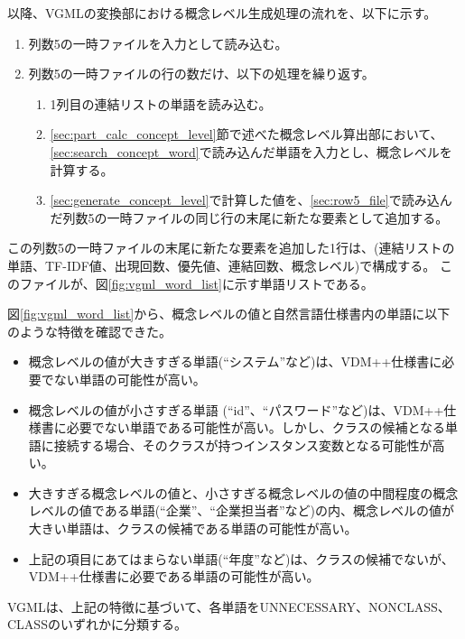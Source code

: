 以降、VGMLの変換部における概念レベル生成処理の流れを、以下に示す。

\begin{enumerate}
    \item 列数5の一時ファイルを入力として読み込む。
    \label{sec:row5_file}
    \item 列数5の一時ファイルの行の数だけ、以下の処理を繰り返す。
        \begin{enumerate}
            \item 1列目の連結リストの単語を読み込む。
            \label{sec:search_concept_word}
            \item \ref{sec:part_calc_concept_level}節で述べた概念レベル算出部において、\ref{sec:search_concept_word}で読み込んだ単語を入力とし、概念レベルを計算する。
            \label{sec:generate_concept_level}
            \item \ref{sec:generate_concept_level}で計算した値を、\ref{sec:row5_file}で読み込んだ列数5の一時ファイルの同じ行の末尾に新たな要素として追加する。
        \end{enumerate}
\end{enumerate}

この列数5の一時ファイルの末尾に新たな要素を追加した1行は、(連結リストの単語、TF-IDF値、出現回数、優先値、連結回数、概念レベル)で構成する。
このファイルが、図\ref{fig:vgml_word_list}に示す単語リストである。

図\ref{fig:vgml_word_list}から、概念レベルの値と自然言語仕様書内の単語に以下のような特徴を確認できた。

\begin{itemize}
    \item 概念レベルの値が大きすぎる単語(``システム''など)は、VDM++仕様書に必要でない単語の可能性が高い。
    \item 概念レベルの値が小さすぎる単語 (``id''、``パスワード''など)は、VDM++仕様書に必要でない単語である可能性が高い。しかし、クラスの候補となる単語に接続する場合、そのクラスが持つインスタンス変数となる可能性が高い。
    \item 大きすぎる概念レベルの値と、小さすぎる概念レベルの値の中間程度の概念レベルの値である単語(``企業''、``企業担当者''など)の内、概念レベルの値が大きい単語は、クラスの候補である単語の可能性が高い。
    \item 上記の項目にあてはまらない単語(``年度''など)は、クラスの候補でないが、VDM++仕様書に必要である単語の可能性が高い。
\end{itemize}

VGMLは、上記の特徴に基づいて、各単語をUNNECESSARY、NONCLASS、CLASSのいずれかに分類する。

